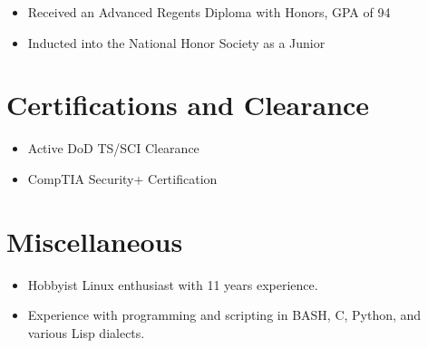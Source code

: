 \documentclass[11pt]{resume}
\begin{document}
\begin{itemize}
\item Received an Advanced Regents Diploma with Honors, GPA of 94
\item Inducted into the National Honor Society as a Junior
\end{itemize}

\section{Certifications and Clearance}
\begin{itemize}
\item Active DoD TS/SCI Clearance
\item CompTIA Security+ Certification
\end{itemize}

\section{Miscellaneous}
\begin{itemize}
\item Hobbyist Linux enthusiast with 11 years experience.
\item Experience with programming and scripting in BASH, C, Python, and various Lisp dialects.
\end{itemize}
\end{document}
